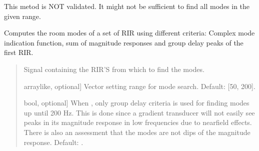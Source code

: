 \documentclass[letterpaper,10pt,english]{sphinxmanual}
\begin{document}

\begin{fulllineitems}
\label{\detokenize{modules/dsptoolbox.room_acoustics:dsptoolbox.room_acoustics.find_modes}}
\pysigstartsignatures
{}
\pysigstopsignatures
\sphinxAtStartPar
This metod is NOT validated. It might not be sufficient to find all
modes in the given range.

\sphinxAtStartPar
Computes the room modes of a set of RIR using different criteria:
Complex mode indication function, sum of magnitude responses and group
delay peaks of the first RIR.
\begin{quote}\begin{description}
\begin{description}
\sphinxlineitem{\sphinxstylestrong{signal}}{[}\sphinxtitleref{Signal}{]}
\sphinxAtStartPar
Signal containing the RIR’S from which to find the modes.

\sphinxlineitem{\sphinxstylestrong{f\_range\_hz}}{[}array\sphinxhyphen{}like, optional{]}
\sphinxAtStartPar
Vector setting range for mode search. Default: {[}50, 200{]}.

\sphinxlineitem{\sphinxstylestrong{proximity\_effect}}{[}bool, optional{]}
\sphinxAtStartPar
When , only group delay criteria is used for finding modes
up until 200 Hz. This is done since a gradient transducer will not
easily see peaks in its magnitude response in low frequencies
due to near\sphinxhyphen{}field effects.
There is also an assessment that the modes are not dips of
the magnitude response. Default: .


\end{description}
\end{description}
\end{quote}
\end{fulllineitems}
\end{document}
